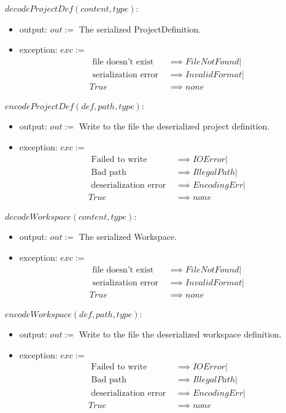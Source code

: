 \documentclass[11pt]{article}
\begin{document}
  $decodeProjectDef(content, type):$
  \begin{itemize}
  \item output: $out :=$ The serialized ProjectDefinition.
  \item exception: $exc :=$
    \begin{align*}
      \text{ file doesn't exist } &\implies FileNotFound|\\
      \text{ serialization error } &\implies InvalidFormat|\\
      True &\implies none
    \end{align*}
  \end{itemize}

  \vspace{1em}
  $encodeProjectDef(def, path, type):$
  \begin{itemize}
  \item output: $out :=$ Write to the file the deserialized project definition.
  \item exception: $exc :=$
    \begin{align*}
      \text{ Failed to write } &\implies IOError|\\
      \text{ Bad path } &\implies IllegalPath|\\
      \text{ deserialization error } &\implies EncodingErr|\\
      True &\implies none
    \end{align*}
  \end{itemize}
  \vspace{1em}
  $decodeWorkspace(content, type):$
  \begin{itemize}
  \item output: $out :=$ The serialized Workspace.
  \item exception: $exc :=$
    \begin{align*}
      \text{ file doesn't exist } &\implies FileNotFound|\\
      \text{ serialization error } &\implies InvalidFormat|\\
      True &\implies none
    \end{align*}
  \end{itemize}
  \vspace{1em}
  $encodeWorkspace(def, path, type):$
  \begin{itemize}
  \item output: $out :=$ Write to the file the deserialized workspace definition.
  \item exception: $exc :=$
    \begin{align*}
      \text{ Failed to write } &\implies IOError|\\
      \text{ Bad path } &\implies IllegalPath|\\
      \text{ deserialization error } &\implies EncodingErr|\\
      True &\implies none
    \end{align*}
  \end{itemize}
\end{document}
